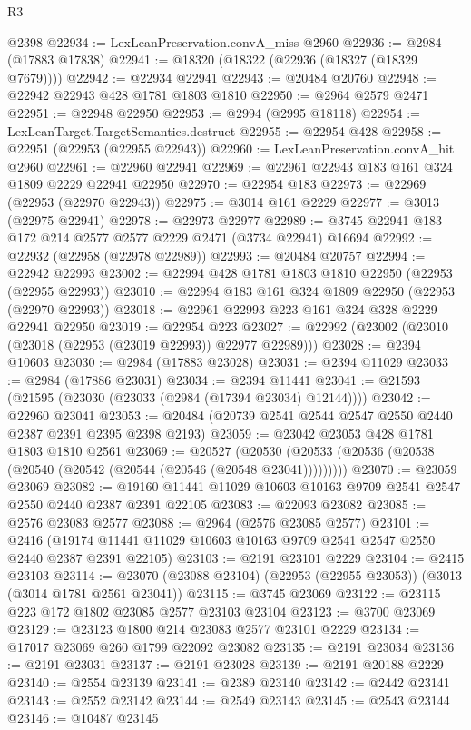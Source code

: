 \begin{lexlean}{R3}
\begin{coremodule}
    @2398
@22934 := LexLeanPreservation.convA_miss @2960
@22936 := @2984 (@17883 @17838)
@22941 := @18320 (@18322 (@22936 (@18327 (@18329 @7679))))
@22942 := @22934 @22941
@22943 := @20484 @20760
@22948 := @22942 @22943 @428 @1781 @1803 @1810
@22950 := @2964 @2579 @2471
@22951 := @22948 @22950
@22953 := @2994 (@2995 @18118)
@22954 := LexLeanTarget.TargetSemantics.destruct
@22955 := @22954 @428
@22958 := @22951 (@22953 (@22955 @22943))
@22960 := LexLeanPreservation.convA_hit @2960
@22961 := @22960 @22941
@22969 := @22961 @22943 @183 @161 @324 @1809 @2229 @22941 @22950
@22970 := @22954 @183
@22973 := @22969 (@22953 (@22970 @22943))
@22975 := @3014 @161 @2229
@22977 := @3013 (@22975 @22941)
@22978 := @22973 @22977
@22989 := @3745 @22941 @183 @172 @214 @2577 @2577 @2229 @2471 (@3734 @22941) @16694
@22992 := @22932 (@22958 (@22978 @22989))
@22993 := @20484 @20757
@22994 := @22942 @22993
@23002 := @22994 @428 @1781 @1803 @1810 @22950 (@22953 (@22955 @22993))
@23010 := @22994 @183 @161 @324 @1809 @22950 (@22953 (@22970 @22993))
@23018 := @22961 @22993 @223 @161 @324 @328 @2229 @22941 @22950
@23019 := @22954 @223
@23027 := @22992 (@23002 (@23010 (@23018 (@22953 (@23019 @22993)) @22977 @22989)))
@23028 := @2394 @10603
@23030 := @2984 (@17883 @23028)
@23031 := @2394 @11029
@23033 := @2984 (@17886 @23031)
@23034 := @2394 @11441
@23041 := @21593 (@21595 (@23030 (@23033 (@2984 (@17394 @23034) @12144))))
@23042 := @22960 @23041
@23053 := @20484 (@20739 @2541 @2544 @2547 @2550 @2440 @2387 @2391 @2395 @2398 @2193)
@23059 := @23042 @23053 @428 @1781 @1803 @1810 @2561
@23069 := @20527
    (@20530 (@20533 (@20536 (@20538 (@20540 (@20542 (@20544 (@20546 (@20548 @23041)))))))))
@23070 := @23059 @23069
@23082 := @19160 @11441 @11029 @10603 @10163 @9709 @2541 @2547 @2550 @2440 @2387 @2391 @22105
@23083 := @22093 @23082
@23085 := @2576 @23083 @2577
@23088 := @2964 (@2576 @23085 @2577)
@23101 := @2416
    (@19174 @11441 @11029 @10603 @10163 @9709 @2541 @2547 @2550 @2440 @2387 @2391 @22105)
@23103 := @2191 @23101 @2229
@23104 := @2415 @23103
@23114 := @23070 (@23088 @23104) (@22953 (@22955 @23053)) (@3013 (@3014 @1781 @2561 @23041))
@23115 := @3745 @23069
@23122 := @23115 @223 @172 @1802 @23085 @2577 @23103 @23104
@23123 := @3700 @23069
@23129 := @23123 @1800 @214 @23083 @2577 @23101 @2229
@23134 := @17017 @23069 @260 @1799 @22092 @23082
@23135 := @2191 @23034
@23136 := @2191 @23031
@23137 := @2191 @23028
@23139 := @2191 @20188 @2229
@23140 := @2554 @23139
@23141 := @2389 @23140
@23142 := @2442 @23141
@23143 := @2552 @23142
@23144 := @2549 @23143
@23145 := @2543 @23144
@23146 := @10487 @23145

\end{coremodule}
\end{lexlean}
